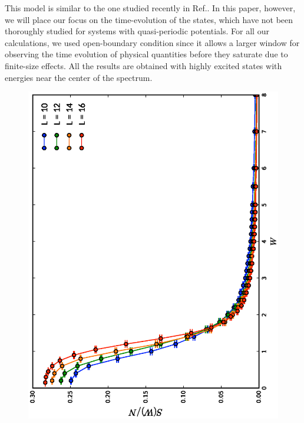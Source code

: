 \documentclass[prl,aps,epsf,showpacs,twocolumn,letterpaper]{revtex4}
\begin{document}
This model is similar to the one studied recently in Ref.\cite{vedika2016}.
In this paper, however, we will place our focus on the time-evolution of the
states, which have not been thoroughly studied for systems with quasi-periodic
potentials.
For all our calculations, we used open-boundary condition since it allows a
larger window for observing the time evolution of physical
quantities\cite{luitz2016time} before they saturate due to finite-size effects.
All the results are obtained with highly excited states with energies near the
center of the spectrum.


\begin{figure}
  \includegraphics[angle=-90,width=0.9\linewidth]{entropy_plot.ps} \\

\end{figure}
\end{document}
